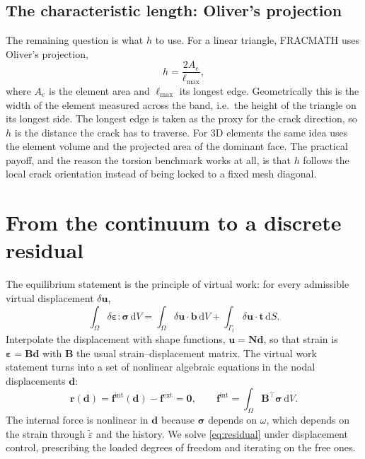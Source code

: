 \documentclass[11pt]{article}
\newcommand{\eps}{\bm{\varepsilon}}
\newcommand{\sig}{\bm{\sigma}}
\newcommand{\eqs}{\tilde{\varepsilon}}
\newcommand{\dd}{\,\mathrm{d}}
\begin{document}
\subsection{The characteristic length: Oliver's projection}

The remaining question is what $h$ to use. For a linear triangle, FRACMATH uses Oliver's
projection,
%
\begin{equation}
h = \frac{2A_e}{\ell_{\max}},
\end{equation}
%
where $A_e$ is the element area and $\ell_{\max}$ its longest edge. Geometrically this is
the width of the element measured across the band, i.e.\ the height of the triangle on its
longest side. The longest edge is taken as the proxy for the crack direction, so $h$ is the
distance the crack has to traverse. For 3D elements the same idea uses the element volume
and the projected area of the dominant face. The practical payoff, and the reason the
torsion benchmark works at all, is that $h$ follows the local crack orientation instead of
being locked to a fixed mesh diagonal.

\section{From the continuum to a discrete residual}

The equilibrium statement is the principle of virtual work: for every admissible virtual
displacement $\delta\bm u$,
%
\begin{equation}
\int_\Omega \delta\eps : \sig \dd V
= \int_\Omega \delta\bm u\cdot\bm b \dd V
+ \int_{\Gamma_t}\delta\bm u\cdot\bm t \dd S .
\end{equation}
%
Interpolate the displacement with shape functions, $\bm u = \bm N\bm d$, so that strain is
$\eps = \bm B\bm d$ with $\bm B$ the usual strain--displacement matrix. The virtual work
statement turns into a set of nonlinear algebraic equations in the nodal displacements
$\bm d$:
%
\begin{equation}
\bm r(\bm d) = \bm f^{\text{int}}(\bm d) - \bm f^{\text{ext}} = \bm 0,
\qquad
\bm f^{\text{int}} = \int_\Omega \bm B^{\!\top}\sig \dd V .
\label{eq:residual}
\end{equation}
%
The internal force is nonlinear in $\bm d$ because $\sig$ depends on $\omega$, which depends
on the strain through $\eqs$ and the history. We solve \eqref{eq:residual} under
displacement control, prescribing the loaded degrees of freedom and iterating on the free
ones.
\end{document}
